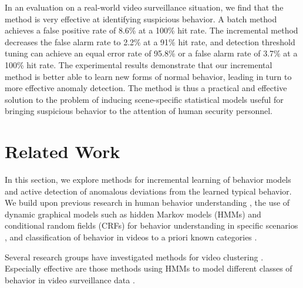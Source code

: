 In an evaluation on a real-world video surveillance situation, we find
that the method is very effective at identifying suspicious
behavior. A batch method achieves a false positive rate of 8.6\% at a
100\% hit rate. The incremental method decreases the false alarm rate
to 2.2\% at a 91\% hit rate, and detection threshold tuning can
achieve an equal error rate of 95.8\% or a false alarm rate of 3.7\%
at a 100\% hit rate.  The experimental results demonstrate that our
incremental method is better able to learn new forms of normal
behavior, leading in turn to more effective anomaly detection. The
method is thus a practical and effective solution to the problem of
inducing scene-specific statistical models useful for bringing
suspicious behavior to the attention of human security personnel.

\section{Related Work}
\label{incremental-related-work}

In this section, we explore methods for incremental learning of
behavior models and active detection of anomalous deviations from the
learned typical behavior.  We build upon previous research in human
behavior
understanding ,
the use of dynamic graphical models such as hidden Markov models
(HMMs) and conditional random fields (CRFs) for behavior understanding
in specific
scenarios ,
and classification of behavior in videos to a priori known categories
.

Several research groups have investigated methods for video clustering
. Especially effective are those methods using HMMs
to model different classes of behavior in video surveillance
data .

